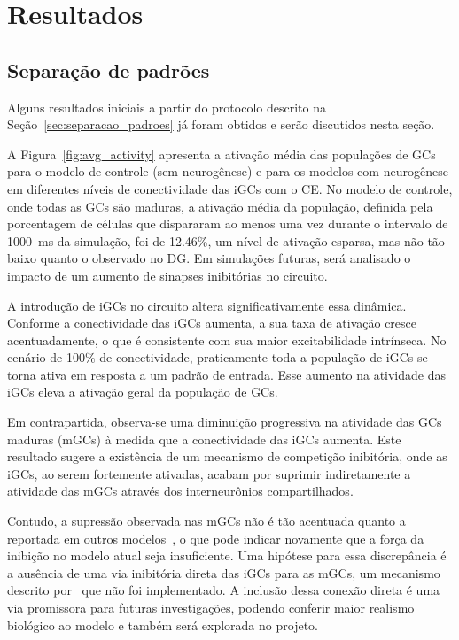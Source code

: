 \chapter{Resultados}

\section{Separação de padrões}


Alguns resultados iniciais a partir do protocolo descrito na Seção~\ref{sec:separacao_padroes} já foram obtidos e serão discutidos
nesta seção.

A Figura~\ref{fig:avg_activity} apresenta a ativação média das populações de GCs para o modelo de controle (sem neurogênese) e
para os modelos com neurogênese em diferentes níveis de conectividade das iGCs com o CE. No modelo de controle, onde todas as GCs
são maduras, a ativação média da população, definida pela porcentagem de células que dispararam ao menos uma vez durante o
intervalo de \SI{1000}{\milli\second} da simulação, foi de 12.46\%, um nível de ativação esparsa, mas não tão baixo quanto o
observado no DG. Em simulações futuras, será analisado o impacto de um aumento de sinapses inibitórias no circuito.

A introdução de iGCs no circuito altera significativamente essa dinâmica. Conforme a conectividade das iGCs aumenta, a sua taxa de
ativação cresce acentuadamente, o que é consistente com sua maior excitabilidade intrínseca. No cenário de 100\% de conectividade,
praticamente toda a população de iGCs se torna ativa em resposta a um padrão de entrada. Esse aumento na atividade das iGCs eleva
a ativação geral da população de GCs.

Em contrapartida, observa-se uma diminuição progressiva na atividade das GCs maduras (mGCs) à medida que a conectividade das iGCs
aumenta. Este resultado sugere a existência de um mecanismo de competição inibitória, onde as iGCs, ao serem fortemente ativadas,
acabam por suprimir indiretamente a atividade das mGCs através dos interneurônios compartilhados.

Contudo, a supressão observada nas mGCs não é tão acentuada quanto a reportada em outros modelos~\cite{kimEffect2024}, o que pode
indicar novamente que a força da inibição no modelo atual seja insuficiente. Uma hipótese para essa discrepância é a ausência de
uma via inibitória direta das iGCs para as mGCs, um mecanismo descrito por~ que não foi
implementado. A inclusão dessa conexão direta é uma via promissora para futuras investigações, podendo conferir maior realismo
biológico ao modelo e também será explorada no projeto.

